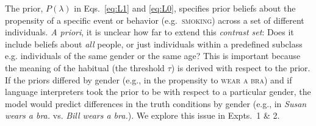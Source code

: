 \documentclass[10pt,letterpaper]{article}
\newcommand{\ndg}[1]{\textcolor{Green}{[ndg: #1]}}
\begin{document}
The prior, $P(\lambda)$ in Eqs.~\ref{eq:L1} and \ref{eq:L0}, specifies prior beliefs about the propensity of a specific event or behavior (e.g.~\textsc{smoking}) across a set of different individuals.
\emph{A priori}, it is unclear how far to extend this \emph{contrast set}: Does it include beliefs about \emph{all} people, or just individuals within a predefined subclass e.g. individuals of the same gender or the same age? 
This is important because the meaning of the habitual (the threshold $\tau$) is derived with respect to the prior. 
If the priors differed by gender (e.g., in the propensity to \textsc{wear a bra}) and if language interpreters took the prior to be with respect to a particular gender, the model would predict differences in the truth conditions by gender (e.g., in \emph{Susan wears a bra.} vs. \emph{Bill wears a bra.}). 
We explore this issue in Expts.~1 \& 2.
%
%



%
% 
\end{document}
